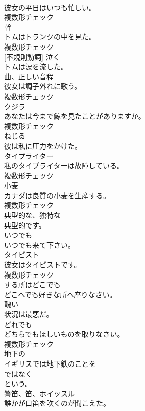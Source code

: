 \documentclass[8pt]{extreport}
\begin{document}
\begin{CJK}{UTF8}{min}
\\	彼女の平日はいつも忙しい。	
\\	複数形チェック
\\	[名詞]	幹	
\\	トムはトランクの中を見た。	
\\	複数形チェック
\\	[動詞] [不規則動詞]	泣く	
\\	トムは涙を流した。	
\\	[名詞]	曲、正しい音程	
\\	彼女は調子外れに歌う。	
\\	複数形チェック
\\	[名詞]	クジラ	
\\	あなたは今まで鯨を見たことがありますか。	
\\	複数形チェック
\\	[動詞]	ねじる	
\\	彼は私に圧力をかけた。	
\\	[名詞]	タイプライター	
\\	私のタイプライターは故障している。	
\\	複数形チェック
\\	[名詞]	小⻨	
\\	カナダは良質の小麦を生産する。	
\\	複数形チェック
\\	[形容詞]	典型的な、独特な	
\\	典型的です。	
\\	[接続詞]	いつでも	
\\	いつでも来て下さい。	
\\	[名詞]	タイピスト	
\\	彼女はタイピストです。	
\\	複数形チェック
\\	[接続詞]	する所はどこでも	
\\	どこへでも好きな所へ座りなさい。	
\\	[形容詞]	醜い	
\\	状況は最悪だ。	
\\	[代名詞]	どれでも	
\\	どちらでもほしいものを取りなさい。	
\\	複数形チェック
\\	[形容詞]	地下の	
\\	イギリスでは地下鉄のことを 
\\	ではなく 
\\	という。	
\\	[名詞]	警笛、笛、ホイッスル	
\\	誰かが口笛を吹くのが聞こえた。	

\end{CJK}
\end{document}
